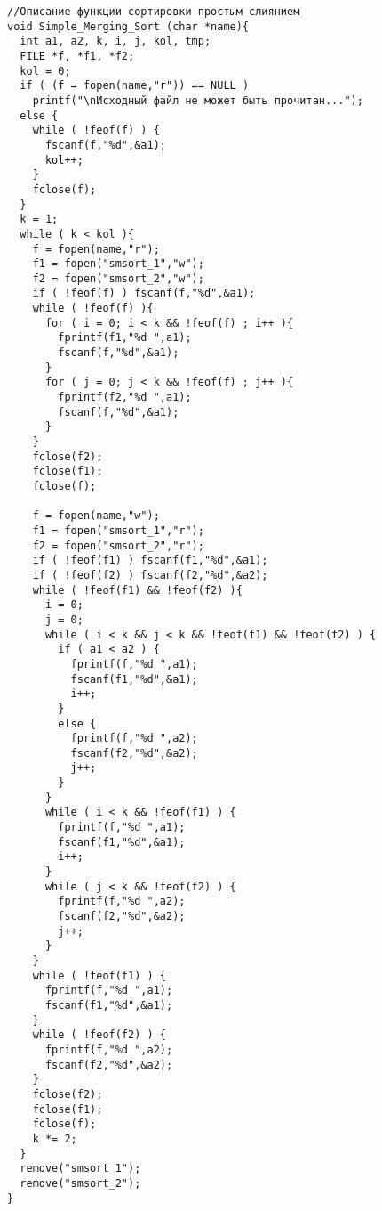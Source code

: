 \begin{lstlisting}[label=code:sort111,caption=Програмна реалізація функції сортування простим злиттям]
//Описание функции сортировки простым слиянием
void Simple_Merging_Sort (char *name){
  int a1, a2, k, i, j, kol, tmp;
  FILE *f, *f1, *f2;
  kol = 0;
  if ( (f = fopen(name,"r")) == NULL )
    printf("\nИсходный файл не может быть прочитан...");
  else {
    while ( !feof(f) ) {
      fscanf(f,"%d",&a1);
      kol++;
    }
    fclose(f);
  }
  k = 1;
  while ( k < kol ){
    f = fopen(name,"r");
    f1 = fopen("smsort_1","w");
    f2 = fopen("smsort_2","w");
    if ( !feof(f) ) fscanf(f,"%d",&a1);
    while ( !feof(f) ){
      for ( i = 0; i < k && !feof(f) ; i++ ){
        fprintf(f1,"%d ",a1);
        fscanf(f,"%d",&a1);
      }
      for ( j = 0; j < k && !feof(f) ; j++ ){
        fprintf(f2,"%d ",a1);
        fscanf(f,"%d",&a1);
      }
    }
    fclose(f2);
    fclose(f1);
    fclose(f);

    f = fopen(name,"w");
    f1 = fopen("smsort_1","r");
    f2 = fopen("smsort_2","r");
    if ( !feof(f1) ) fscanf(f1,"%d",&a1);
    if ( !feof(f2) ) fscanf(f2,"%d",&a2);
    while ( !feof(f1) && !feof(f2) ){
      i = 0;
      j = 0;
      while ( i < k && j < k && !feof(f1) && !feof(f2) ) {
        if ( a1 < a2 ) {
          fprintf(f,"%d ",a1);
          fscanf(f1,"%d",&a1);
          i++;
        }
        else {
          fprintf(f,"%d ",a2);
          fscanf(f2,"%d",&a2);
          j++;
        }
      }
      while ( i < k && !feof(f1) ) {
        fprintf(f,"%d ",a1);
        fscanf(f1,"%d",&a1);
        i++;
      }
      while ( j < k && !feof(f2) ) {
        fprintf(f,"%d ",a2);
        fscanf(f2,"%d",&a2);
        j++;
      }
    }
    while ( !feof(f1) ) {
      fprintf(f,"%d ",a1);
      fscanf(f1,"%d",&a1);
    }
    while ( !feof(f2) ) {
      fprintf(f,"%d ",a2);
      fscanf(f2,"%d",&a2);
    }
    fclose(f2);
    fclose(f1);
    fclose(f);
    k *= 2;
  }
  remove("smsort_1");
  remove("smsort_2");
}
\end{lstlisting}